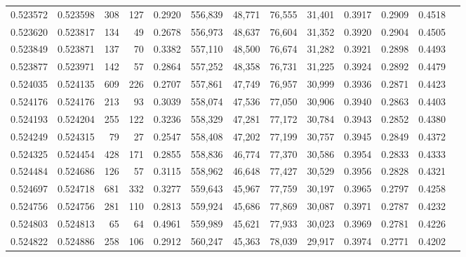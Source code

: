 \begin{tabular}{rrrrrrrrrrrrr}
0.523572 & 0.523598 &   308 &   127 &                                     0.2920 & 556,839 &  48,771 &  76,555 &  31,401 & 0.3917 & 0.2909 & 0.4518 \\
0.523620 & 0.523817 &   134 &    49 &                                     0.2678 & 556,973 &  48,637 &  76,604 &  31,352 & 0.3920 & 0.2904 & 0.4505 \\
0.523849 & 0.523871 &   137 &    70 &                                     0.3382 & 557,110 &  48,500 &  76,674 &  31,282 & 0.3921 & 0.2898 & 0.4493 \\
0.523877 & 0.523971 &   142 &    57 &                                     0.2864 & 557,252 &  48,358 &  76,731 &  31,225 & 0.3924 & 0.2892 & 0.4479 \\
0.524035 & 0.524135 &   609 &   226 &                                     0.2707 & 557,861 &  47,749 &  76,957 &  30,999 & 0.3936 & 0.2871 & 0.4423 \\
0.524176 & 0.524176 &   213 &    93 &                                     0.3039 & 558,074 &  47,536 &  77,050 &  30,906 & 0.3940 & 0.2863 & 0.4403 \\
0.524193 & 0.524204 &   255 &   122 &                                     0.3236 & 558,329 &  47,281 &  77,172 &  30,784 & 0.3943 & 0.2852 & 0.4380 \\
0.524249 & 0.524315 &    79 &    27 &                                     0.2547 & 558,408 &  47,202 &  77,199 &  30,757 & 0.3945 & 0.2849 & 0.4372 \\
0.524325 & 0.524454 &   428 &   171 &                                     0.2855 & 558,836 &  46,774 &  77,370 &  30,586 & 0.3954 & 0.2833 & 0.4333 \\
0.524484 & 0.524686 &   126 &    57 &                                     0.3115 & 558,962 &  46,648 &  77,427 &  30,529 & 0.3956 & 0.2828 & 0.4321 \\
0.524697 & 0.524718 &   681 &   332 &                                     0.3277 & 559,643 &  45,967 &  77,759 &  30,197 & 0.3965 & 0.2797 & 0.4258 \\
0.524756 & 0.524756 &   281 &   110 &                                     0.2813 & 559,924 &  45,686 &  77,869 &  30,087 & 0.3971 & 0.2787 & 0.4232 \\
0.524803 & 0.524813 &    65 &    64 &                                     0.4961 & 559,989 &  45,621 &  77,933 &  30,023 & 0.3969 & 0.2781 & 0.4226 \\
0.524822 & 0.524886 &   258 &   106 &                                     0.2912 & 560,247 &  45,363 &  78,039 &  29,917 & 0.3974 & 0.2771 & 0.4202 \\

\end{tabular}
